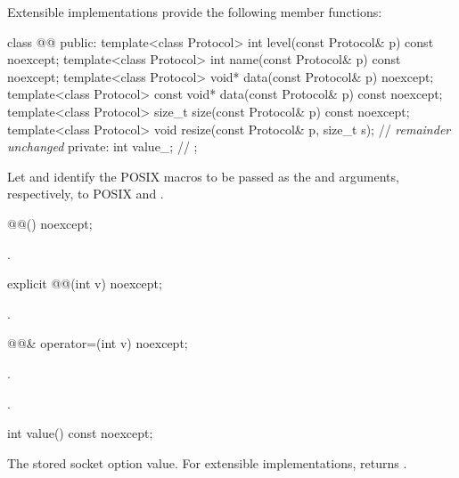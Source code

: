 %
\pnum
Extensible implementations provide the following member functions:

\begin{codeblock}
class @@
{
public:
  template<class Protocol> int level(const Protocol& p) const noexcept;
  template<class Protocol> int name(const Protocol& p) const noexcept;
  template<class Protocol> void* data(const Protocol& p) noexcept;
  template<class Protocol> const void* data(const Protocol& p) const noexcept;
  template<class Protocol> size_t size(const Protocol& p) const noexcept;
  template<class Protocol> void resize(const Protocol& p, size_t s);
  // \textit{remainder unchanged}
private:
  int value_; // \expos
};
\end{codeblock}

\pnum
Let  and  identify the POSIX macros to be passed as the  and  arguments, respectively, to POSIX  and .

\begin{itemdecl}
@@() noexcept;
\end{itemdecl}

\begin{itemdescr}
\pnum
\postconditions {}.
\end{itemdescr}

\begin{itemdecl}
explicit @@(int v) noexcept;
\end{itemdecl}

\begin{itemdescr}
\pnum
\postconditions {}.
\end{itemdescr}

\begin{itemdecl}
@@& operator=(int v) noexcept;
\end{itemdecl}

\begin{itemdescr}
\pnum
\returns {}.

\pnum
\postconditions {}.
\end{itemdescr}

\begin{itemdecl}
int value() const noexcept;
\end{itemdecl}

\begin{itemdescr}
\pnum
\returns The stored socket option value. For extensible implementations, returns .
\end{itemdescr}

